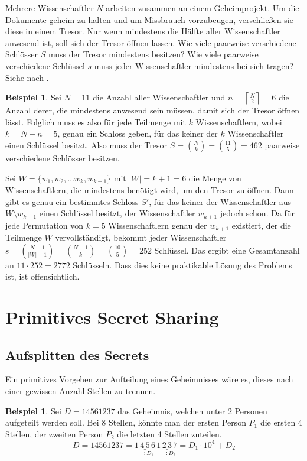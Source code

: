 \documentclass[12pt, a4paper, oneside, titlepage]{report}
\theoremstyle{definition}
\newtheorem{bsp}[lemma]{Beispiel}
\begin{document}
	Mehrere Wissenschaftler $ N $ arbeiten zusammen an einem Geheimprojekt. Um die Dokumente geheim zu halten und um Missbrauch vorzubeugen, verschließen sie diese in einem Tresor. Nur wenn mindestens die Hälfte aller Wissenschaftler anwesend ist, soll sich der Tresor öffnen lassen. Wie viele paarweise verschiedene Schlösser $ S $ muss der Tresor mindestens besitzen? Wie viele paarweise verschiedene Schlüssel $ s $ muss jeder Wissenschaftler mindestens bei sich tragen? Siehe \cite{shamir} nach \cite{liu}.
	
	\begin{bsp}
		Sei $ N = 11 $ die Anzahl aller Wissenschaftler und $ n = \left\lceil\frac{N}{2} \right\rceil = 6 $ die Anzahl derer, die mindestens anwesend sein müssen, damit sich der Tresor öffnen lässt. Folglich muss es also für jede Teilmenge mit $ k $ Wissenschaftlern, wobei $ k = N - n = 5 $, genau ein Schloss geben, für das keiner der $ k $ Wissenschaftler einen Schlüssel besitzt. Also muss der Tresor $ S = \binom{N}{k} = \binom{11}{5} = 462 $ paarweise verschiedene Schlösser besitzen.
		
		Sei $ W = \{w_1, w_2, \dots w_k, w_{k+1}\} $ mit $ |W| = k + 1 = 6 $ die Menge von Wissenschaftlern, die mindestens benötigt wird, um den Tresor zu öffnen. Dann gibt es genau ein bestimmtes Schloss $ S' $, für das keiner der Wissenschaftler aus $ W \setminus w_{k+1} $ einen Schlüssel besitzt, der Wissenschaftler $ w_{k+1} $ jedoch schon. Da für jede Permutation von $ k = 5 $ Wissenschaftlern genau der $ w_{k+1} $ existiert, der die Teilmenge $ W $ \glqq vervollständigt\grqq, bekommt jeder Wissenschaftler $ s = \binom{N-1}{|W|-1} = \binom{N-1}{k} = \binom{10}{5} = 252 $ Schlüssel. Das ergibt eine Gesamtanzahl an $ 11 \cdot 252 = 2772 $ Schlüsseln. Dass dies keine praktikable Lösung des Problems ist, ist offensichtlich.
	\end{bsp}
	
	\section{Primitives Secret Sharing}
	\subsection{Aufsplitten des Secrets}
		Ein primitives Vorgehen zur Aufteilung eines Geheimnisses wäre es, dieses nach einer gewissen Anzahl Stellen zu trennen.
		
		\begin{bsp}
			Sei $ D = 14561237 $ das Geheimnis, welchen unter 2 Personen aufgeteilt werden soll. Bei 8 Stellen, könnte man der ersten Person $ P_1 $ die ersten 4 Stellen, der zweiten Person $ P_2 $ die letzten 4 Stellen zuteilen.
			$$ D = 14561237 = \underset{=:D_1}{\underline{1\,4\,5\,6}} \, \underset{=:D_2}{\underline{1\,2\,3\,7}} = D_1 \cdot 10^4 + D_2 $$
		\end{bsp}
	
\end{document}
